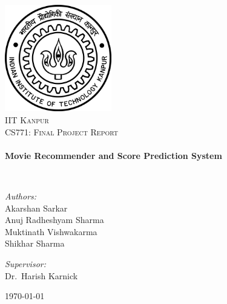 \begin{titlepage}
\begin{center}

\includegraphics[width=0.35\textwidth]{./logo.jpg}~\\[1cm]

\textsc{\LARGE IIT Kanpur}\\[1.5cm]

\textsc{\Large CS771: Final Project Report}\\[0.5cm]

\HRule \\[0.4cm]
{ \huge \bfseries Movie Recommender and Score Prediction System \\[0.4cm] }

\HRule \\[1.5cm]

\begin{minipage}{0.5\textwidth}
\begin{flushleft} \large
\emph{Authors:}\\
Akarshan Sarkar\\
Anuj Radheshyam Sharma\\
Muktinath Vishwakarma\\
Shikhar Sharma
\end{flushleft}
\end{minipage}
\begin{minipage}{0.4\textwidth}
\begin{flushright} \large
\emph{Supervisor:} \\
Dr.~Harish Karnick
\end{flushright}
\end{minipage}

\vfill

{\large \today}

\end{center}
\end{titlepage}